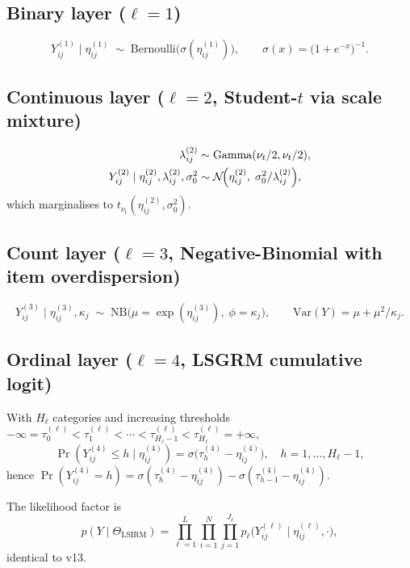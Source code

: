 \documentclass[11pt]{article}
\begin{document}
\subsection{Binary layer ($\ell=1$)}
\begin{equation}
Y_{ij}^{(1)}\mid\eta_{ij}^{(1)} \;\sim\; \mathrm{Bernoulli}\!\bigl(\sigma(\eta_{ij}^{(1)})\bigr),
\qquad
\sigma(x)=\bigl(1+e^{-x}\bigr)^{-1}.
\label{eq:bin}
\end{equation}

\subsection{Continuous layer ($\ell=2$, Student-$t$ via scale mixture)}
\begin{align}
\lambda_{ij}^{(2)} &\sim \mathrm{Gamma}(\nu_t/2,\nu_t/2),\\
Y_{ij}^{(2)}\mid\eta_{ij}^{(2)},\lambda_{ij}^{(2)},\sigma_0^2
   &\sim \mathcal{N}\!\Bigl(\eta_{ij}^{(2)},\;\sigma_0^2/\lambda_{ij}^{(2)}\Bigr),
\label{eq:cont}
\end{align}
which marginalises to $t_{\nu_t}(\eta_{ij}^{(2)},\sigma_0^2)$.

\subsection{Count layer ($\ell=3$, Negative-Binomial with item overdispersion)}
\begin{equation}
Y_{ij}^{(3)}\mid\eta_{ij}^{(3)},\kappa_j
   \;\sim\; \mathrm{NB}\!\bigl(\mu=\exp(\eta_{ij}^{(3)}),\;\phi=\kappa_j\bigr),
\qquad
\mathrm{Var}(Y) = \mu + \mu^2/\kappa_j.
\label{eq:nb}
\end{equation}

\subsection{Ordinal layer ($\ell=4$, LSGRM cumulative logit)}
With $H_\ell$ categories and increasing thresholds
$-\infty=\tau_0^{(\ell)}<\tau_1^{(\ell)}<\cdots<\tau_{H_\ell-1}^{(\ell)}<\tau_{H_\ell}^{(\ell)}=+\infty$,
\begin{equation}
\Pr(Y_{ij}^{(4)}\le h\mid\eta_{ij}^{(4)})
   = \sigma\!\bigl(\tau_h^{(4)} - \eta_{ij}^{(4)}\bigr),
\quad h=1,\ldots,H_\ell-1,
\label{eq:lsgrm}
\end{equation}
hence $\Pr(Y_{ij}^{(4)}=h)
   =\sigma(\tau_h^{(4)}-\eta_{ij}^{(4)})-\sigma(\tau_{h-1}^{(4)}-\eta_{ij}^{(4)})$.

\medskip
The likelihood factor is
\begin{equation}
p(Y\mid\Theta_{\text{LSIRM}})
 =\prod_{\ell=1}^{L}\prod_{i=1}^{N}\prod_{j=1}^{J_\ell}
   p_\ell\!\bigl(Y_{ij}^{(\ell)}\mid\eta_{ij}^{(\ell)},\cdot\bigr),
\label{eq:fulllik}
\end{equation}
identical to v13.
\end{document}
